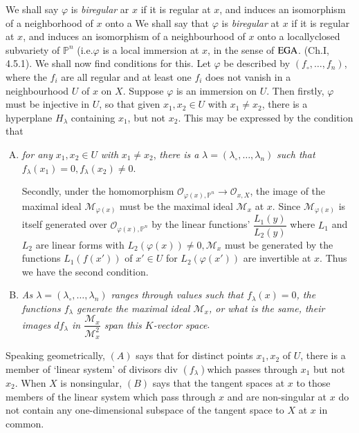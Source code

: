 We shall say $\varphi$ is \textit {biregular} ar $x$ if it is regular
at $x$, and induces an isomorphism of a neighborhood of $x$ onto a We
shall say that $\varphi$ is \textit{biregular} at $x$ if it is regular
at $x$, and induces an isomorphism of a neighbourhood of $x$ onto a
locally\pageoriginale closed subvariety of $\mathbb{P}^n$
(i.e.$\varphi$ is a local 
immersion at $x$, in the sense of $\operatorname{EGA}$. (Ch.I, 4.5.1). We shall now
find conditions for this. Let $\varphi$ be described by $(f_\circ, \ldots,
f_n)$, where the $f_i$ are all regular and at least one $f_i$ does not
vanish in a neighbourhood $U$ of $x$ on $X$. Suppose $\varphi$ is an
immersion on $U$. Then firstly, $\varphi$ must be injective in $U$, so
that given $x_1,x_2 \in U$ with $x_1 \neq x_2$, there is a hyperplane
$H_{\lambda}$ containing $x_1$, but not $ x_2$. This may be expressed
by the condition that  
\begin{enumerate}[(A)]
\item \textit{for any} $x_1, x_2 \in U$ \textit{with} $x_1 \neq x_2$,
  \textit{there is a } $\lambda = ( \lambda_\circ  , \ldots, \lambda_n)$
  \textit{such that} $f_{\lambda}(x_1)= 0, f_{\lambda}(x_2) \neq 0$. 

  Secondly, under the homomorphism $\mathscr{O}_{\varphi
    (x),\mathbb{P}^n} \to \mathscr{O}_{x,X}$, the image of the maximal
  ideal $\mathcal{M}_{\varphi (x)}$ must be the maximal ideal
  $\mathcal{M}_x$ at $x$. Since $\mathcal{M}_{\varphi (x)}$ is itself
  generated over $\mathscr{O}_{\varphi (x),\mathbb{P}^n}$ by the linear
  functions' $\dfrac {L_1(y)}{L_2(y)}$ where $L_1$ and $L_2$ are
  linear forms with $L_2(\varphi (x)) \neq 0,\mathcal{M}_x$ must be
  generated by the functions $L_1(f(x'))$ of $x' \in U$ for
  $L_2(\varphi (x'))$ are invertible at $x$. Thus we have the second
  condition. 

\item  \textit{As $\lambda = (\lambda_\circ, \ldots , \lambda_n)$
  ranges through values such that $f_{\lambda}(x)=0$, the
    functions $f_{\lambda}$ generate the maximal ideal
  $\mathcal{M}_x$, or what is the same, their images
  $df_{\lambda}$ in $\dfrac{\mathcal{M}_{x}}{\mathcal{M}^2_x}$
    span this $K$-vector space}. 
\end{enumerate}

Speaking geometrically, $(A)$ says that for distinct points $x_1, x_2$
of $U$, there is a member of `linear system' of divisors
div $(f_{\lambda})$\pageoriginale which passes through $x_1$ but not
$x_2$. When $X$ is nonsingular, $(B)$ says that the tangent spaces at
$x$ to those members of the linear system which pass through $x$ and
are non-singular at $x$ do not contain any one-dimensional subspace of
the tangent space to $X$ at $x$ in common.  

